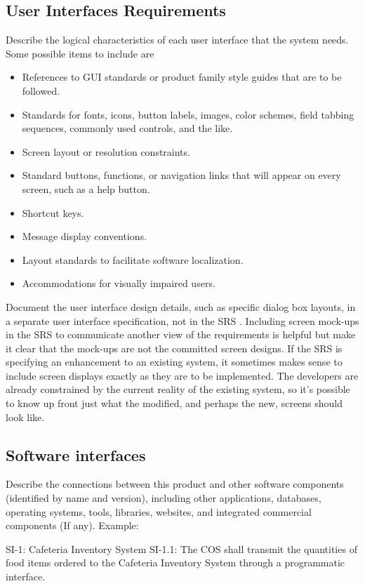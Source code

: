 \documentclass[A4paper,12pt]{report}
\theoremstyle{plain}
\theoremstyle{definition}
\theoremstyle{remark}
\numberwithin{equation}{section}
\begin{document}
\subsection{User Interfaces Requirements}
Describe the logical characteristics of each user interface that the system needs. Some possible items to include are

\begin{itemize}
	\item References to GUI standards or product family style guides that are to be followed.
	\item	Standards for fonts, icons, button labels, images, color schemes, field tabbing sequences, commonly used controls, and the like.
	\item	Screen layout or resolution constraints.
	\item	Standard buttons, functions, or navigation links that will appear on every screen, such as a help button.
	\item	Shortcut keys.
	\item	Message display conventions.
	\item	Layout standards to facilitate software localization.
	\item	Accommodations for visually impaired users.	
\end{itemize}

Document the user interface design details, such as specific dialog box layouts, in a separate user interface specification, not in the SRS . Including screen mock-ups in the SRS  to communicate another view of the requirements is helpful but make it clear that the mock-ups are not the committed screen designs. If the SRS is specifying an enhancement to an existing system, it sometimes makes sense to include screen displays exactly as they are to be implemented. The developers are already constrained by the current reality of the existing system, so it's possible to know up front just what the modified, and perhaps the new, screens should look like.  

\subsection{Software interfaces}
Describe the connections between this product and other software components (identified by name and version), including other applications, databases, operating systems, tools, libraries, websites, and integrated commercial components (If any).
Example:

SI-1: Cafeteria Inventory System
SI-1.1:	The COS shall transmit the quantities of food items ordered to the Cafeteria Inventory System through a programmatic interface.
\end{document}
